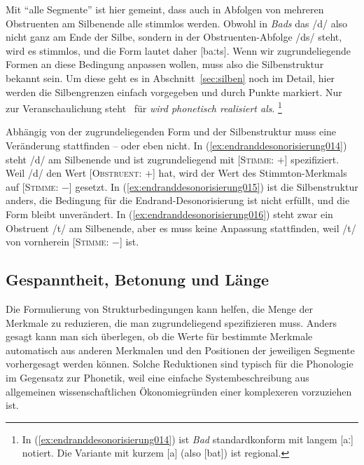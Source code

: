 
Mit "`alle Segmente"' ist hier gemeint, dass auch in Abfolgen von mehreren Obstruenten am Silbenende alle stimmlos werden.
Obwohl in \textit{Bads} das /d/ also nicht ganz am Ende der Silbe, sondern in der Obstruenten-Abfolge /ds/ steht, wird es stimmlos, und die Form lautet daher [baːts].
Wenn wir zugrundeliegende Formen an diese Bedingung anpassen wollen, muss also die Silbenstruktur bekannt sein.
Um diese geht es in Abschnitt~\ref{sec:silben} noch im Detail, hier werden die Silbengrenzen einfach vorgegeben und durch Punkte markiert.
Nur zur Veranschaulichung steht \phopro\ für \textit{wird phonetisch  realisiert als}.%
\footnote{In (\ref{ex:endranddesonorisierung014}) ist \textit{Bad} standardkonform mit langem [aː] notiert.
Die Variante mit kurzem [a] (also [bat]) ist regional.}

\begin{exe}
  \ex\label{ex:endranddesonorisierung013}
  \begin{xlist}
  \end{xlist}
\end{exe}

Abhängig von der zugrundeliegenden Form und der Silbenstruktur muss eine Veränderung stattfinden -- oder eben nicht.
In (\ref{ex:endranddesonorisierung014}) steht /d/ am Silbenende und ist zugrundeliegend mit [\textsc{Stimme}: $+$] spezifiziert.
Weil /d/ den Wert [\textsc{Obstruent}: $+$] hat, wird der Wert des Stimmton-Merkmals auf [\textsc{Stimme}: $-$] gesetzt.
In (\ref{ex:endranddesonorisierung015}) ist die Silbenstruktur anders, die Bedingung für die Endrand-Desonorisierung ist nicht erfüllt, und die Form bleibt unverändert.
In (\ref{ex:endranddesonorisierung016}) steht zwar ein Obstruent /t/ am Silbenende, aber es muss keine Anpassung stattfinden, weil /t/ von vornherein [\textsc{Stimme}: $-$] ist.

\subsection{Gespanntheit, Betonung und Länge}
\label{sec:gespanntheitbetonungundlaenge}

Die Formulierung von Strukturbedingungen kann helfen, die Menge der Merkmale zu reduzieren, die man zugrundeliegend spezifizieren muss.
Anders gesagt kann man sich überlegen, ob die Werte für bestimmte Merkmale automatisch aus anderen Merkmalen und den Positionen der jeweiligen Segmente vorhergesagt werden können.
Solche Reduktionen sind typisch für die Phonologie im Gegensatz zur Phonetik, weil eine einfache Systembeschreibung aus allgemeinen wissenschaftlichen Ökonomiegründen einer komplexeren vorzuziehen ist.

